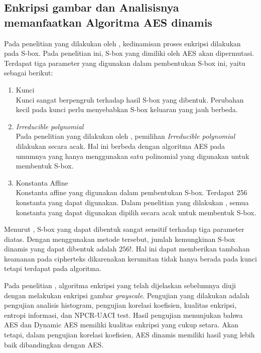 \subsection{Enkripsi gambar dan Analisisnya memanfaatkan Algoritma AES dinamis}

Pada penelitian yang dilakukan oleh \textcite{singh2019}, kedinamisan proses enkripsi dilakukan pada S-box. Pada penelitian ini, S-box yang dimiliki oleh AES akan dipermutasi. Terdapat tiga parameter yang digunakan dalam pembentukan S-box ini, yaitu sebagai berikut:
\begin{enumerate}
  \item Kunci\\ Kunci sangat berpengruh terhadap hasil S-box yang dibentuk. Perubahan kecil pada kunci perlu menyebabkan S-box keluaran yang jauh berbeda.
  \item \emph{Irreducible polynomial}\\ Pada penelitian yang dilakukan oleh \textcite{singh2019}, pemilihan \emph{Irreducible polynomial} dilakukan secara acak. Hal ini berbeda dengan algoritma AES pada umumnya yang hanya menggunakan satu polinomial yang digunakan untuk membentuk S-box.
  \item Konstanta Affine\\ Konstanta affine yang digunakan dalam pembentukan S-box. Terdapat 256 konstanta yang dapat digunakan. Dalam penelitian yang dilakukan \textcite{singh2019}, semua konstanta yang dapat digunakan dipilih secara acak untuk membentuk S-box.
\end{enumerate}

Menurut \textcite{singh2019}, S-box yang dapat dibentuk sangat sensitif terhadap tiga parameter diatas. Dengan menggunakan metode tersebut, jumlah kemungkinan S-box dinamis yang dapat dibentuk adalah $256!$. Hal ini dapat memberikan tambahan keamanan pada cipherteks dikarenakan kerumitan tidak hanya berada pada kunci tetapi terdapat pada algoritma.

Pada penelitian \textcite{singh2019}, algoritma enkripsi yang telah dijelaskan sebelumnya diuji dengan melakukan enkripsi gambar \emph{grayscale}. Pengujian yang dilakukan adalah pengujian analisis histogram, pengujian korelasi koefisien, kualitas enkripsi, entropi informasi, dan NPCR-UACI test. Hasil pengujian menunjukan bahwa AES dan Dynamic AES memiliki kualitas enkripsi yang cukup setara. Akan tetapi, dalam pengujian korelasi koefisien, AES dinamis memiliki hasil yang lebih baik dibandingkan dengan AES.

